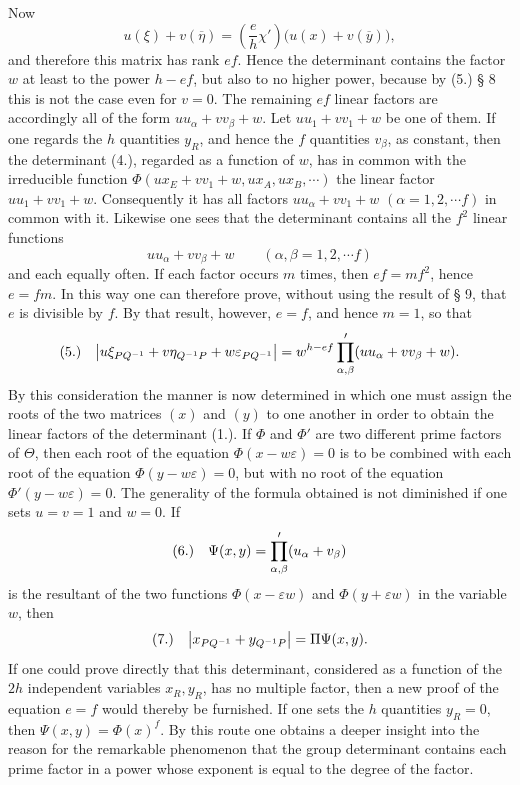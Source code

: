 \documentclass[11pt]{article}
\makeatletter
\newcommand{\frobtag}[2]{\[\begin{array}{@{}r@{\quad}l@{}}\textup{(#1)} & \displaystyle #2\end{array}\]}
\newcommand{\frobtagc}[2]{\[\begin{array}{@{}r@{\quad}c@{}}\textup{(#1)} & \displaystyle #2\end{array}\]}
\makeatother
\begin{document}
Now
\[
u(\xi)+v(\overline{\eta})=\left(\frac{e}{h}\chi'\right)\bigl(u(x)+v(\overline{y})\bigr),
\]
and therefore this matrix has rank $ef$. Hence the determinant contains the factor $w$ at least to the power $h-ef$, but also to no higher power, because by (5.) § 8 this is not the case even for $v=0$. The remaining $ef$ linear factors are accordingly all of the form $uu_\alpha+vv_\beta+w$. Let $uu_1+vv_1+w$ be one of them. If one regards the $h$ quantities $y_R$, and hence the $f$ quantities $v_\beta$, as constant, then the determinant (4.), regarded as a function of $w$, has in common with the irreducible function $\Phi(ux_E+vv_1+w,ux_A,ux_B,\cdots)$ the linear factor $uu_1+vv_1+w$. Consequently it has all factors $uu_\alpha+vv_1+w$ $(\alpha=1,2,\cdots f)$ in common with it. Likewise one sees that the determinant contains all the $f^2$ linear functions
\[
uu_\alpha+vv_\beta+w\qquad (\alpha,\beta=1,2,\cdots f)
\]
and each equally often. If each factor occurs $m$ times, then $ef=mf^2$, hence $e=fm$. In this way one can therefore prove, without using the result of § 9, that $e$ is divisible by $f$. By that result, however, $e=f$, and hence $m=1$, so that
\frobtag{5.}{\left|u\xi_{PQ^{-1}}+v\eta_{Q^{-1}P}+w\varepsilon_{PQ^{-1}}\right|=w^{h-ef}\prod_{\alpha,\beta}'(uu_\alpha+vv_\beta+w).}
By this consideration the manner is now determined in which one must assign the roots of the two matrices $(x)$ and $(y)$ to one another in order to obtain the linear factors of the determinant (1.). If $\Phi$ and $\Phi'$ are two different prime factors of $\Theta$, then each root of the equation $\Phi(x-w\varepsilon)=0$ is to be combined with each root of the equation $\Phi(y-w\varepsilon)=0$, but with no root of the equation $\Phi'(y-w\varepsilon)=0$. The generality of the formula obtained is not diminished if one sets $u=v=1$ and $w=0$. If
\frobtagc{6.}{\Psi(x,y)=\prod_{\alpha,\beta}'(u_\alpha+v_\beta)}
is the resultant of the two functions $\Phi(x-\varepsilon w)$ and $\Phi(y+\varepsilon w)$ in the variable $w$, then
\frobtagc{7.}{\left|x_{PQ^{-1}}+y_{Q^{-1}P}\right|=\Pi\Psi(x,y).}
If one could prove directly that this determinant, considered as a function of the $2h$ independent variables $x_R,y_R$, has no multiple factor, then a new proof of the equation $e=f$ would thereby be furnished. If one sets the $h$ quantities $y_R=0$, then $\Psi(x,y)=\Phi(x)^f$. By this route one obtains a deeper insight into the reason for the remarkable phenomenon that the group determinant contains each prime factor in a power whose exponent is equal to the degree of the factor.
\end{document}
